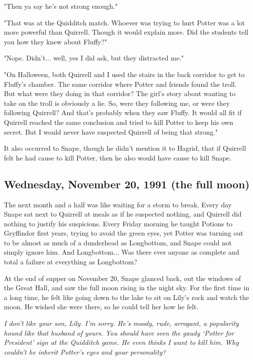 \documentclass[a4paper,11pt]{article}
\begin{document}
"Then ya say he's not strong enough."

"That was at the Quidditch match. Whoever was trying to hurt Potter was a lot more powerful than Quirrell. Though it would explain more. Did the students tell you how they knew about Fluffy?"

"Nope. Didn't... well, yes I did ask, but they distracted me."

"On Halloween, both Quirrell and I used the stairs in the back corridor to get to Fluffy's chamber. The same corridor where Potter and friends found the troll. But what were they doing in that corridor? The girl's story about wanting to take on the troll is obviously a lie. So, were they following me, or were they following Quirrell? And that's probably when they saw Fluffy. It would all fit if Quirrell reached the same conclusion and tried to kill Potter to keep his own secret. But I would never have suspected Quirrell of being that strong."

It also occurred to Snape, though he didn't mention it to Hagrid, that if Quirrell felt he had cause to kill Potter, then he also would have cause to kill Snape.

\subsection{Wednesday, November 20, 1991 (the full moon)}

The next month and a half was like waiting for a storm to break. Every day Snape sat next to Quirrell at meals as if he suspected nothing, and Quirrell did nothing to justify his suspicions. Every Friday morning he taught Potions to Gryffindor first years, trying to avoid the green eyes, yet Potter was turning out to be almost as much of a dunderhead as Longbottom, and Snape could not simply ignore him. And Longbottom... Was there ever anyone as complete and total a failure at everything as Longbottom?

At the end of supper on November 20, Snape glanced back, out the windows of the Great Hall, and saw the full moon rising in the night sky. For the first time in a long time, he felt like going down to the lake to sit on Lily's rock and watch the moon. He wished she were there, so he could tell her how he felt.

\emph{I don't like your son, Lily. I'm sorry. He's moody, rude, arrogant, a popularity hound like that husband of yours. You should have seen the gaudy `Potter for President' sign at the Quidditch game. He even thinks I want to kill him. Why couldn't he inherit Potter's eyes and your personality?}
\end{document}
